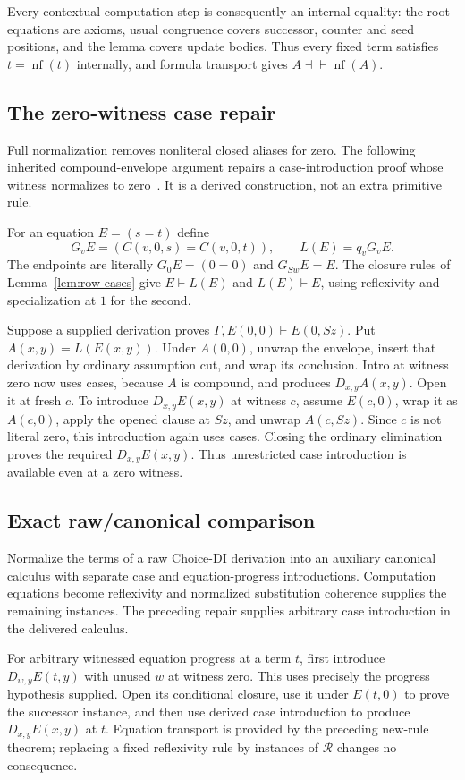 \documentclass[11pt,letterpaper]{article}
\theoremstyle{definition}\newtheorem{definition}[theorem]{Definition}
\theoremstyle{remark}\newtheorem{remark}[theorem]{Remark}
\newcommand{\nf}{\operatorname{nf}}
\begin{document}
Every contextual computation step is consequently an internal equality:
the root equations are axioms, usual congruence covers successor, counter and
seed positions, and the lemma covers update bodies. Thus every fixed term
satisfies $t=\nf(t)$ internally, and formula transport gives
$A\dashv\vdash\nf(A)$.

\subsection{The zero-witness case repair}
\label{sec:zero-repair}

Full normalization removes nonliteral closed aliases for zero. The following
inherited compound-envelope argument repairs a case-introduction proof whose
witness normalizes to zero~\cite{normalization,prior}. It is a derived
construction, not an extra primitive rule.

For an equation $E=(s=t)$ define
\[
 G_vE=(C(v,0,s)=C(v,0,t)),\qquad L(E)=q_vG_vE.
\]
The endpoints are literally $G_0E=(0=0)$ and $G_{Sw}E=E$.
The closure rules of Lemma~\ref{lem:row-cases} give $E\vdash L(E)$ and
$L(E)\vdash E$, using reflexivity and specialization at $1$ for the second.

Suppose a supplied derivation proves
$\Gamma,E(0,0)\vdash E(0,Sz)$. Put $A(x,y)=L(E(x,y))$.
Under $A(0,0)$, unwrap the envelope, insert that derivation by ordinary
assumption cut, and wrap its conclusion. Intro at witness zero now uses
cases, because $A$ is compound, and produces $D_{x,y}A(x,y)$.
Open it at fresh $c$. To introduce $D_{x,y}E(x,y)$ at witness $c$, assume
$E(c,0)$, wrap it as $A(c,0)$, apply the opened clause at $Sz$, and unwrap
$A(c,Sz)$. Since $c$ is not literal zero, this introduction again uses cases.
Closing the ordinary elimination proves the required $D_{x,y}E(x,y)$.
Thus unrestricted case introduction is available even at a zero witness.

\subsection{Exact raw/canonical comparison}

Normalize the terms of a raw Choice-DI derivation into an auxiliary canonical
calculus with separate case and equation-progress introductions. Computation
equations become reflexivity and normalized substitution coherence supplies
the remaining instances. The preceding repair supplies arbitrary case
introduction in the delivered calculus.

For arbitrary witnessed equation progress at a term $t$, first introduce
$D_{w,y}E(t,y)$ with unused $w$ at witness zero. This uses precisely the
progress hypothesis supplied. Open its conditional closure, use it under
$E(t,0)$ to prove the successor instance, and then use derived case
introduction to produce $D_{x,y}E(x,y)$ at $t$. Equation transport is
provided by the preceding new-rule theorem; replacing a fixed reflexivity
rule by instances of $\mathcal R$ changes no consequence.
\end{document}
